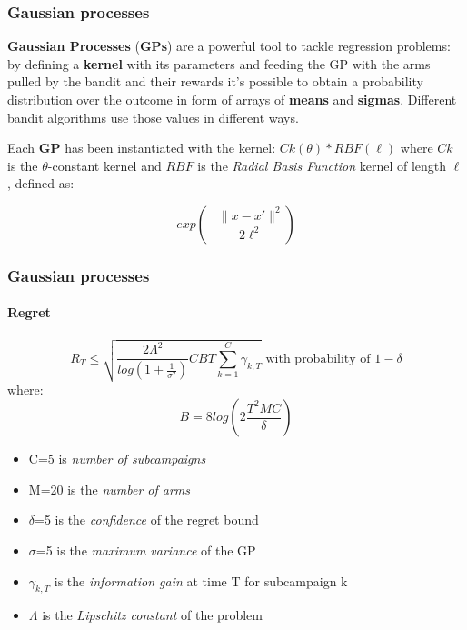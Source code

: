 
\begin{frame}

\frametitle{Gaussian processes}

\textbf{Gaussian Processes} (\textbf{GPs}) are a powerful tool to tackle regression problems: by defining a \textbf{kernel} with its parameters and feeding the GP with the arms pulled by the bandit and their rewards it's possible to obtain a probability distribution over the outcome in form of arrays of \textbf{means} and \textbf{sigmas}.
Different bandit algorithms use those values in different ways.

Each \textbf{GP} has been instantiated with the kernel: $Ck(\theta) * RBF(\ell)$ where $Ck$ is the $\theta$-constant kernel and $RBF$ is the \textit{Radial Basis Function} kernel of length $\ell$, defined as:

\begin{displaymath}
exp \left( - \frac{ \lVert x - x' \rVert^2 }{ 2\ell^2} \right)
\end{displaymath}

\end{frame}


\begin{frame}

\frametitle{Gaussian processes}
\framesubtitle{Regret}

\vspace*{-3em}

\begin{displaymath}
    R_T \le \sqrt{ \frac{2\Lambda^2}{log(1+\frac{1}{\sigma^2})} CBT \sum_{k=1}^C \gamma_{k, T} } \text{ with probability of } 1 - \delta
\end{displaymath}
where:
\begin{displaymath}
    B = 8log\left( 2\frac{T^2MC}{\delta} \right)
\end{displaymath}

\begin{itemize}
    \setlength\itemsep{-0.3em}
    \item C=5 is \textit{number of subcampaigns}
    \item M=20 is the \textit{number of arms}
    \item $\delta$=5 is the \textit{confidence} of the regret bound
    \item $\sigma$=5 is the \textit{maximum variance} of the GP
    \item $\gamma_{k, T}$ is the \textit{information gain} at time T for subcampaign k
    \item $\Lambda$ is the \textit{Lipschitz constant} of the problem
\end{itemize}

\end{frame}

